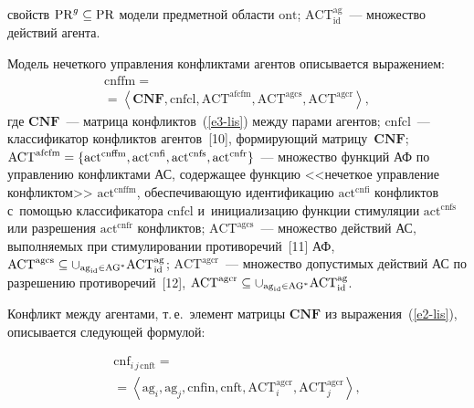 \begin{multicols}{2}
\noindent
 свойств $\mathrm{PR}^g\hm\subseteq \mathrm{PR}$ модели 
предметной области $\mathrm{ont}$; $\mathrm{ACT}_{\mathrm{id}}^{\mathrm{ag}}$~--- множество 
действий агента.


  Модель нечеткого управ\-ле\-ния конфликтами агентов описывается 
выражением:
  \begin{multline}
  \mathrm{cnffm} ={}\\
  {}=\left\langle \mathbf{CNF}, \mathrm{cnfcl}, \mathrm{ACT}^{\mathrm{afcfm}}, 
\mathrm{ACT}^{\mathrm{agcs}}, \mathrm{ACT}^{\mathrm{agcr}}\right\rangle,
  \label{e2-lis}
  \end{multline}
где $\mathbf{CNF}$~--- матрица конфликтов~(\ref{e3-lis}) между парами 
агентов; $\mathrm{cnfcl}$~--- классификатор конфликтов агентов~[10], формирующий  
мат\-ри\-цу~$\mathbf{CNF}$;\linebreak $\mathrm{ACT}^{\mathrm{afcfm}}\hm= \{ 
\mathrm{act}^{\mathrm{cnffm}}, \mathrm{act}^{\mathrm{cnfi}}, \mathrm{act}^{\mathrm{cnfs}}, 
\mathrm{act}^{\mathrm{cnfr}}\}$~--- множество функций АФ по управ\-ле\-нию 
конфликтами АС, содержащее функцию <<нечеткое управ\-ле\-ние конфликтом>> 
$\mathrm{act}^{\mathrm{cnffm}}$, обеспечивающую \mbox{идентификацию} 
$\mathrm{act}^{\mathrm{cnfi}}$ конфликтов с~по\-мощью классификатора $\mathrm{cnfcl}$ 
и~инициализацию функции стимуляции $\mathrm{act}^{\mathrm{cnfs}}$ или разрешения 
$\mathrm{act}^{\mathrm{cnfr}}$ конфликтов; $\mathrm{ACT}^{\mathrm{agcs}}$~--- множество 
действий АС, выполняемых при стимулировании противоречий~[11] АФ, 
$\mathrm{ACT}^{\mathrm{agcs}} \hm\subseteq \cup_{\mathrm{ag}_{\mathrm{id}}\in 
\mathrm{AG}^*}  \mathrm{ACT}_{\mathrm{id}}^{\mathrm{ag}}$; $\mathrm{ACT}^{\mathrm{agcr}}$~--- 
множество допустимых действий АС по разрешению противоречий~[12], 
$\mathrm{ACT}^{\mathrm{agcr}} \hm\subseteq \cup_{\mathrm{ag}_{\mathrm{id}}\in 
\mathrm{AG}^*} \mathrm{ACT}_{\mathrm{id}}^{\mathrm{ag}}$.
  
  Конфликт между агентами, т.\,е.\ элемент матрицы $\mathbf{CNF}$ из 
выражения~(\ref{e2-lis}), описывается следующей формулой:

\vspace*{-7pt}

\noindent
  \begin{multline}
  \mathrm{cnf}_{i\,j\,\mathrm{cnft}}={}\\
  {}= \left\langle \mathrm{ag}_i,\mathrm{ag}_j, \mathrm{cnfin}, \mathrm{cnft}, 
\mathrm{ACT}_i^{\mathrm{agcr}}, \mathrm{ACT}_j^{\mathrm{agcr}}\right\rangle,
  \label{e3-lis}
  \end{multline}
  

\end{multicols}
